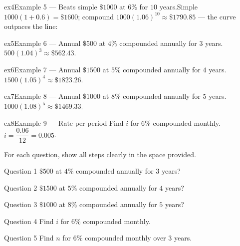 \documentclass[11pt]{article}
\begin{document}
\begin{example}{ex4}{Example 5 --- Beats simple}
$\$1000$ at $6\%$ for $10$ years.\soln Simple $1000(1+0.6)=\$1600$; compound $1000(1.06)^{10}\approx\$1790.85$ — the curve outpaces the line:
\end{example}

\begin{example}{ex5}{Example 6 --- Annual}
$\$500$ at $4\%$ compounded annually for $3$ years.\soln $500(1.04)^{3}\approx\$562.43$.
\end{example}

\begin{example}{ex6}{Example 7 --- Annual}
$\$1500$ at $5\%$ compounded annually for $4$ years.\soln $1500(1.05)^{4}\approx\$1823.26$.
\end{example}

\begin{example}{ex7}{Example 8 --- Annual}
$\$1000$ at $8\%$ compounded annually for $5$ years.\soln $1000(1.08)^{5}\approx\$1469.33$.
\end{example}

\begin{example}{ex8}{Example 9 --- Rate per period}
Find $i$ for $6\%$ compounded monthly.\soln $i=\dfrac{0.06}{12}=0.005$.
\end{example}

\clearpage
{}
For each question, show all steps clearly in the space provided.

\begin{qbox}{Question 1}
$\$500$ at $4\%$ compounded annually for $3$ years?\workspace{2.4cm}
\end{qbox}

\begin{qbox}{Question 2}
$\$1500$ at $5\%$ compounded annually for $4$ years?\workspace{2.4cm}
\end{qbox}

\begin{qbox}{Question 3}
$\$1000$ at $8\%$ compounded annually for $5$ years?\workspace{2.4cm}
\end{qbox}

\begin{qbox}{Question 4}
Find $i$ for $6\%$ compounded monthly.\workspace{2.4cm}
\end{qbox}

\begin{qbox}{Question 5}
Find $n$ for $6\%$ compounded monthly over $3$ years.\workspace{2.4cm}
\end{qbox}
\end{document}

